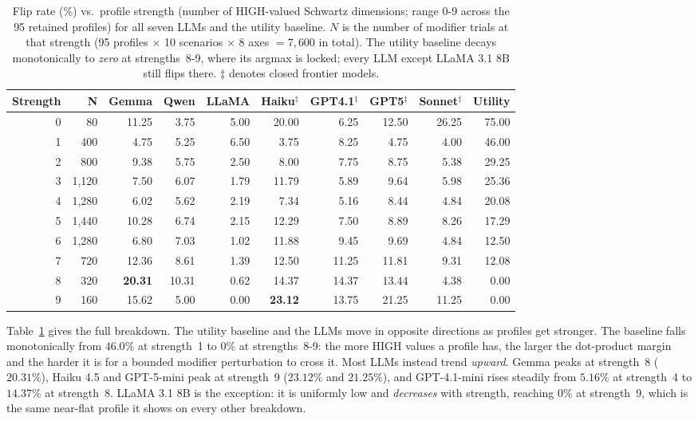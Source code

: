 \begin{table}[t]
\centering\footnotesize
\setlength{\tabcolsep}{4pt}
\begin{tabular}{@{}rrrrrrrrrr@{}}
\toprule
\textbf{Strength} & \textbf{N} & \textbf{Gemma} & \textbf{Qwen} & \textbf{LLaMA} & \textbf{Haiku}$^\ddagger$ & \textbf{GPT4.1}$^\ddagger$ & \textbf{GPT5}$^\ddagger$ & \textbf{Sonnet}$^\ddagger$ & \textbf{Utility} \\
\midrule
0 & 80 & 11.25 & 3.75 & 5.00 & 20.00 & 6.25 & 12.50 & 26.25 & 75.00 \\
1 & 400 & 4.75 & 5.25 & 6.50 & 3.75 & 8.25 & 4.75 & 4.00 & 46.00 \\
2 & 800 & 9.38 & 5.75 & 2.50 & 8.00 & 7.75 & 8.75 & 5.38 & 29.25 \\
3 & 1{,}120 & 7.50 & 6.07 & 1.79 & 11.79 & 5.89 & 9.64 & 5.98 & 25.36 \\
4 & 1{,}280 & 6.02 & 5.62 & 2.19 & 7.34 & 5.16 & 8.44 & 4.84 & 20.08 \\
5 & 1{,}440 & 10.28 & 6.74 & 2.15 & 12.29 & 7.50 & 8.89 & 8.26 & 17.29 \\
6 & 1{,}280 & 6.80 & 7.03 & 1.02 & 11.88 & 9.45 & 9.69 & 4.84 & 12.50 \\
7 & 720 & 12.36 & 8.61 & 1.39 & 12.50 & 11.25 & 11.81 & 9.31 & 12.08 \\
8 & 320 & \textbf{20.31} & 10.31 & 0.62 & 14.37 & 14.37 & 13.44 & 4.38 & 0.00 \\
9 & 160 & 15.62 & 5.00 & 0.00 & \textbf{23.12} & 13.75 & 21.25 & 11.25 & 0.00 \\
\bottomrule
\end{tabular}
\caption{Flip rate (\%) vs.\ profile strength (number of HIGH-valued Schwartz dimensions; range 0-9 across the 95 retained profiles) for all seven LLMs and the utility baseline. $N$ is the number of modifier trials at that strength (95 profiles $\times$ 10 scenarios $\times$ 8 axes $=7{,}600$ in total). The utility baseline decays monotonically to \emph{zero} at strengths~8-9, where its argmax is locked; every LLM except LLaMA 3.1 8B still flips there. $\ddagger$ denotes closed frontier models.}
\label{tab:strength}
\end{table}

Table~\ref{tab:strength} gives the full breakdown. The utility baseline and the LLMs move in opposite directions as profiles get stronger. The baseline falls monotonically from $46.0\%$ at strength~1 to $0\%$ at strengths~8-9: the more HIGH values a profile has, the larger the dot-product margin and the harder it is for a bounded modifier perturbation to cross it. Most LLMs instead trend \emph{upward}. Gemma peaks at strength~8 ($20.31\%$), Haiku 4.5 and GPT-5-mini peak at strength~9 ($23.12\%$ and $21.25\%$), and GPT-4.1-mini rises steadily from $5.16\%$ at strength~4 to $14.37\%$ at strength~8. LLaMA 3.1 8B is the exception: it is uniformly low and \emph{decreases} with strength, reaching $0\%$ at strength~9, which is the same near-flat profile it shows on every other breakdown.

